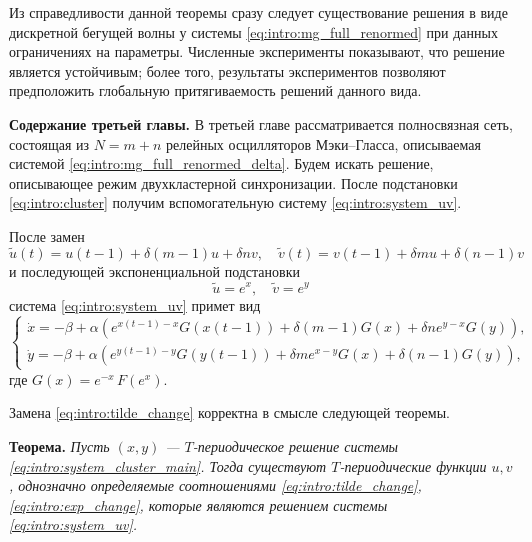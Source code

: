 Из справедливости данной теоремы сразу следует существование решения в виде дискретной бегущей волны у системы \eqref{eq:intro:mg_full_renormed} при данных ограничениях на параметры. Численные эксперименты показывают, что решение является устойчивым; более того, результаты экспериментов позволяют предположить глобальную притягиваемость решений данного вида.

\bigskip

\textbf{Содержание третьей главы.} В третьей главе рассматривается полносвязная сеть, состоящая из $N = m + n$ релейных осцилляторов Мэки--Гласса, описываемая системой \eqref{eq:intro:mg_full_renormed_delta}. Будем искать решение, описывающее режим двухкластерной синхронизации. После подстановки \eqref{eq:intro:cluster} получим вспомогательную систему \eqref{eq:intro:system_uv}.

После замен
\begin{equation}
	\label{eq:intro:tilde_change}
	\tilde{u}(t) = u(t - 1) + \delta (m - 1) u + \delta n v, \quad \tilde{v}(t) = v(t - 1) + \delta m u + \delta (n - 1) v
\end{equation}
%
и последующей экспоненциальной подстановки
\begin{equation}
	\label{eq:intro:exp_change}
	\tilde{u} = e^x, \quad \tilde{v} = e^y
\end{equation}
%
система \eqref{eq:intro:system_uv} примет вид
%
\begin{equation}
	\label{eq:intro:system_cluster_main}
	\begin{cases}
		\dot{x} = -\beta + \alpha \left(e^{x(t - 1) - x} G(x(t - 1)) + \delta (m - 1) G(x) + \delta n e^{y - x} G(y)\right),\\
		\dot{y} = -\beta + \alpha \left(e^{y(t - 1) - y} G(y(t - 1)) + \delta m e^{x - y} G(x) + \delta (n - 1) G(y)\right),
	\end{cases}
\end{equation}
где $G(x) = e^{-x} \, F(e^x)$.

Замена \eqref{eq:intro:tilde_change} корректна в смысле следующей теоремы.

\textbf{Теорема.} \textit{Пусть $(x, y)$ --- $T$-периодическое решение системы \eqref{eq:intro:system_cluster_main}. Тогда существуют $T$-периодические функции $u, v$, однозначно определяемые соотношениями \eqref{eq:intro:tilde_change}, \eqref{eq:intro:exp_change}, которые являются решением системы \eqref{eq:intro:system_uv}.}

